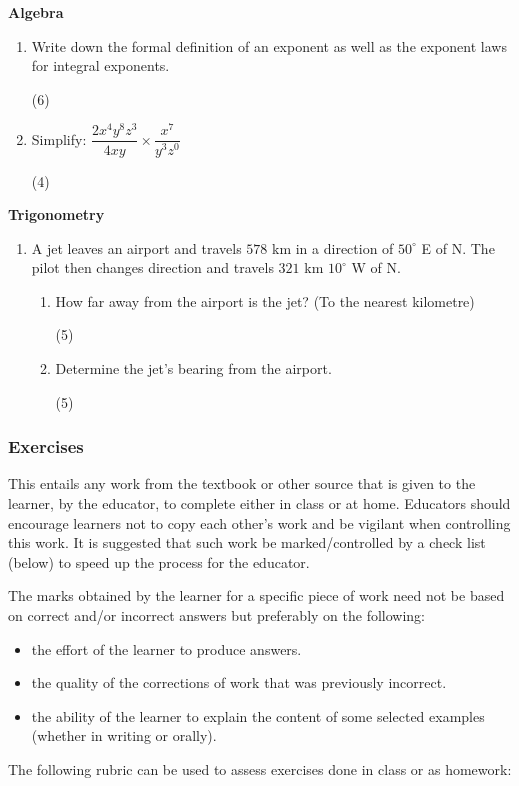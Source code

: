 \textbf{Algebra}
\begin{enumerate}[itemsep=0pt, label=\textbf{\arabic*}. ] 
\item Write down the formal definition of an exponent as well as the exponent laws for integral exponents.\begin{flushright}(6)\end{flushright}

\item Simplify: $\dfrac{2x^4y^8z^3}{4xy} \times \dfrac{x^7}{y^3z^0}$	\begin{flushright}(4)\end{flushright}
\end{enumerate}

\textbf{Trigonometry}
\begin{enumerate}[itemsep=0pt, label=\textbf{\arabic*}. ] 
\item A jet leaves an airport and travels $578$ km in a direction of $50^{\circ}$ E of N. The pilot then changes direction and travels $321$ km $10^{\circ}$ W of N.
\begin{enumerate}[itemsep=0pt,label=\textbf{(\alph*)}]
\item  How far away from the airport is the jet? (To the nearest kilometre) \begin{flushright}(5)\end{flushright}
\item Determine the jet’s bearing from the airport.\begin{flushright}(5)\end{flushright}
\end{enumerate}
\end{enumerate}

\subsubsection{Exercises}
This entails any work from the textbook or other source that is given to the learner, by the educator, to complete either in class or at home. Educators should encourage learners not to copy each other’s work and be vigilant when controlling this work. It is suggested that such work be marked/controlled by a check list (below) to speed up the process for the educator. \par

The marks obtained by the learner for a specific piece of work need not be based on correct and/or incorrect answers but preferably on the following:
\begin{itemize}[noitemsep]
\item the effort of the learner to produce answers.
\item the quality of the corrections of work that was previously incorrect.
\item the ability of the learner to explain the content of some selected examples (whether in writing or orally).
\end{itemize}
The following rubric can be used to assess exercises done in class or as homework: 

